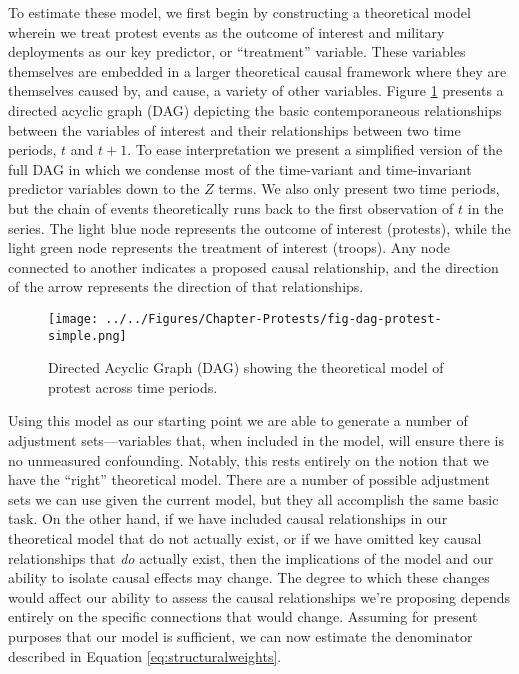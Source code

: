 To estimate these model, we first begin by constructing a theoretical model wherein we treat protest events as the outcome of interest and military deployments as our key predictor, or ``treatment'' variable. These variables themselves are embedded in a larger theoretical causal framework where they are themselves caused by, and cause, a variety of other variables. Figure \ref{fig:dagtroops} presents a directed acyclic graph (DAG) depicting the basic contemporaneous relationships between the variables of interest and their relationships between two time periods, $t$ and $t+1$. To ease interpretation we present a simplified version of the full DAG in which we condense most of the time-variant and time-invariant predictor variables down to the $Z$ terms. We also only present two time periods, but the chain of events theoretically runs back to the first observation of $t$ in the series. The light blue node represents the outcome of interest (protests), while the light green node represents the treatment of interest (troops). Any node connected to another indicates a proposed causal relationship, and the direction of the arrow represents the direction of that relationships.

\begin{figure}[t]
	\centering\texttt{[image: ../../Figures/Chapter-Protests/fig-dag-protest-simple.png]}
	\caption{Directed Acyclic Graph (DAG) showing the theoretical model of protest across time periods.}
	\label{fig:dagtroops}
\end{figure}

Using this model as our starting point we are able to generate a number of adjustment sets---variables that, when included in the model, will ensure there is no unmeasured confounding. Notably, this rests entirely on the notion that we have the ``right'' theoretical model. There are a number of possible adjustment sets we can use given the current model, but they all accomplish the same basic task. On the other hand, if we have included causal relationships in our theoretical model that do not actually exist, or if we have omitted key causal relationships that \textit{do} actually exist, then the implications of the model and our ability to isolate causal effects may change. The degree to which these changes would affect our ability to assess the causal relationships we're proposing depends entirely on the specific connections that would change. Assuming for present purposes that our model is sufficient, we can now estimate the denominator described in Equation \ref{eq:structuralweights}.

